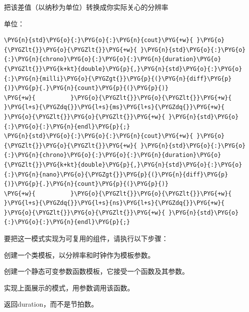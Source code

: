 
把该差值（以纳秒为单位）转换成你实际关心的分辨率



单位：



\begin{codeblockbg}
\begin{Verbatim}[commandchars=\\\{\},breaklines=true,breakanywhere=true,fontsize=\codefont,xleftmargin=17bp]
\PYG{n}{std}\PYG{o}{:}\PYG{o}{:}\PYG{n}{cout}\PYG{+w}{ }\PYG{o}{\PYGZlt{}}\PYG{o}{\PYGZlt{}}\PYG{+w}{ }\PYG{n}{std}\PYG{o}{:}\PYG{o}{:}\PYG{n}{chrono}\PYG{o}{:}\PYG{o}{:}\PYG{n}{duration}\PYG{o}{\PYGZlt{}}\PYG{k+kt}{double}\PYG{p}{,}\PYG{n}{std}\PYG{o}{:}\PYG{o}{:}\PYG{n}{milli}\PYG{o}{\PYGZgt{}}\PYG{p}{(}\PYG{n}{diff}\PYG{p}{)}\PYG{p}{.}\PYG{n}{count}\PYG{p}{(}\PYG{p}{)}
\PYG{+w}{          }\PYG{o}{\PYGZlt{}}\PYG{o}{\PYGZlt{}}\PYG{+w}{ }\PYG{l+s}{\PYGZdq{}}\PYG{l+s}{ms}\PYG{l+s}{\PYGZdq{}}\PYG{+w}{ }\PYG{o}{\PYGZlt{}}\PYG{o}{\PYGZlt{}}\PYG{+w}{ }\PYG{n}{std}\PYG{o}{:}\PYG{o}{:}\PYG{n}{endl}\PYG{p}{;}
\PYG{n}{std}\PYG{o}{:}\PYG{o}{:}\PYG{n}{cout}\PYG{+w}{ }\PYG{o}{\PYGZlt{}}\PYG{o}{\PYGZlt{}}\PYG{+w}{ }\PYG{n}{std}\PYG{o}{:}\PYG{o}{:}\PYG{n}{chrono}\PYG{o}{:}\PYG{o}{:}\PYG{n}{duration}\PYG{o}{\PYGZlt{}}\PYG{k+kt}{double}\PYG{p}{,}\PYG{n}{std}\PYG{o}{:}\PYG{o}{:}\PYG{n}{nano}\PYG{o}{\PYGZgt{}}\PYG{p}{(}\PYG{n}{diff}\PYG{p}{)}\PYG{p}{.}\PYG{n}{count}\PYG{p}{(}\PYG{p}{)}
\PYG{+w}{          }\PYG{o}{\PYGZlt{}}\PYG{o}{\PYGZlt{}}\PYG{+w}{ }\PYG{l+s}{\PYGZdq{}}\PYG{l+s}{ns}\PYG{l+s}{\PYGZdq{}}\PYG{+w}{ }\PYG{o}{\PYGZlt{}}\PYG{o}{\PYGZlt{}}\PYG{+w}{ }\PYG{n}{std}\PYG{o}{:}\PYG{o}{:}\PYG{n}{endl}\PYG{p}{;}
\end{Verbatim}
\end{codeblockbg}



要把这一模式实现为可复用的组件，请执行以下步骤：



创建一个类模板，以分辨率和时钟作为模板参数。



创建一个静态可变参数函数模板，它接受一个函数及其参数。



实现上面展示的模式，用参数调用该函数。



返回duration，而不是节拍数。


